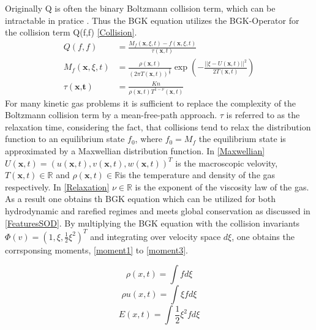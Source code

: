 \documentclass[12pt, a4paper]{article}
\begin{document}
Originally Q is often the binary Boltzmann collision term, which can be intractable in pratice \cite{BGK}. Thus the BGK equation utilizes the BGK-Operator for the collision term Q(f,f) \cref{Collision}\cite{Bernard}.
\begin{align}
Q(f,f) &= \frac{M_f(\textbf{x},\xi,t) - f(\textbf{x},\xi,t)}{\tau(\textbf{x},t)} \label{Collision}\\
M_f(\textbf{x},\xi,t) &= \frac{\rho(\textbf{x},t)}{(2\pi T(\textbf{x},t))^{\frac{3}{2}}}\exp(-\frac{||\xi -U(\textbf{x},t)||^2}{2T(\textbf{x},t)})  \label{Maxwellian}\\
\tau(\textbf{x,t}) &= \frac{Kn}{\rho(\textbf{x},t)T^{1-\nu}(\textbf{x},t)} \label{Relaxation}
\end{align}
For many kinetic gas problems it is sufficient to replace the complexity of the Boltzmann collision term by a mean-free-path approach. $\tau$ is referred to as the relaxation time, considering the fact, that collisions tend to relax the distribution function to an equilibrium state $f_0$, where $f_0 = M_f$ the equilibrium state is approximated by a Maxwellian distribution function\cite{BGK}. In \cref{Maxwellian} $U(\textbf{x},t) = (u(\textbf{x},t),v(\textbf{x},t),w(\textbf{x},t))^T$ is the macroscopic velovity, $T(\textbf{x},t) \in \mathbb{R}$ and $\rho(\textbf{x},t)\in \mathbb{R}$is the temperature and density of the gas respectively. In \cref{Relaxation} $\nu\in\mathbb{R}$ is the exponent of the viscosity law of the gas. As a result one obtains th BGK equation which can be utilized for both hydrodynamic and rarefied regimes and meets global conservation as discussed in \cref{FeaturesSOD}. By multiplying the BGK equation with the collision invariants $\Phi(v) = (1,\xi,\frac{1}{2}\xi^2)^T$ and integrating over velocity space $d\xi$, one obtains the corrsponsing moments, \cref{moment1} to \cref{moment3}.
\begin{multicols}{3}
	\begin{equation}
		\rho(x,t) = \int f d\xi \label{moment1}
	\end{equation}
	\begin{equation}
		\rho u(x,t) = \int \xi f d\xi \label{moment2}
	\end{equation}
	\begin{equation}
		E(x,t) = \int \frac{1}{2}\xi^2 f d\xi \label{moment3}
	\end{equation}
\end{multicols}
\end{document}
